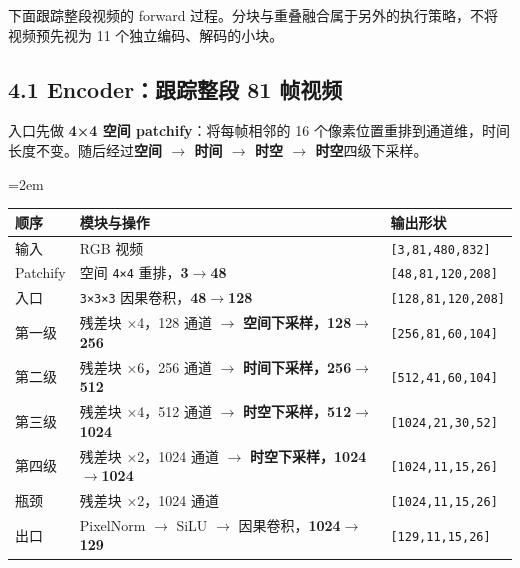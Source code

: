 \documentclass[
  11pt,
  a4paper,
  fontset=none]{ctexart}
\newcounter{none} %
\newcommand{\NotesTableStyle}{\linespread{1}\fontsize{9.5pt}{13pt}\selectfont\setlength{\tabcolsep}{4pt}\renewcommand{\arraystretch}{1.1}\setlength{\extrarowheight}{5pt}\setlength{\LTpre}{5pt}\setlength{\LTpost}{6pt}\setlength{\parskip}{0pt}\emergencystretch=2em}
\begin{document}
下面跟踪整段视频的 forward
过程。分块与重叠融合属于另外的执行策略，不将视频预先视为 11
个独立编码、解码的小块。


\subsection{4.1 Encoder：跟踪整段 81 帧视频}\label{ltx25-encoder}

入口先做 \textbf{4×4 空间 patchify}：将每帧相邻的 16
个像素位置重排到通道维，时间长度不变。随后经过\textbf{空间
\(\rightarrow\) 时间 \(\rightarrow\) 时空 \(\rightarrow\)
时空}四级下采样。

\begingroup\NotesTableStyle\fontsize{10.5pt}{14pt}\selectfont\renewcommand{\arraystretch}{1.08}\setlength{\extrarowheight}{3pt}

{\def\LTcaptype{none} %
\begin{longtable}[]{@{}
  >{\raggedright\arraybackslash}p{}
  >{\raggedright\arraybackslash}p{}
  >{\raggedright\arraybackslash}p{}@{}}
\toprule\noalign{}
\begin{minipage}[b]{\linewidth}\raggedright
顺序
\end{minipage} & \begin{minipage}[b]{\linewidth}\raggedright
模块与操作
\end{minipage} & \begin{minipage}[b]{\linewidth}\raggedright
输出形状
\end{minipage} \\
\midrule\noalign{}
\endhead
\bottomrule\noalign{}
\endlastfoot
输入 & RGB 视频 & \texttt{{[}3,81,480,832{]}} \\
Patchify & 空间 \texttt{4×4} 重排，\textbf{3\(\rightarrow\)48} &
\texttt{{[}48,81,120,208{]}} \\
入口 & \texttt{3×3×3} 因果卷积，\textbf{48\(\rightarrow\)128} &
\texttt{{[}128,81,120,208{]}} \\
第一级 & 残差块 ×4，128 通道 \(\rightarrow\)
\textbf{空间下采样，128\(\rightarrow\)256} &
\texttt{{[}256,81,60,104{]}} \\
第二级 & 残差块 ×6，256 通道 \(\rightarrow\)
\textbf{时间下采样，256\(\rightarrow\)512} &
\texttt{{[}512,41,60,104{]}} \\
第三级 & 残差块 ×4，512 通道 \(\rightarrow\)
\textbf{时空下采样，512\(\rightarrow\)1024} &
\texttt{{[}1024,21,30,52{]}} \\
第四级 & 残差块 ×2，1024 通道 \(\rightarrow\)
\textbf{时空下采样，1024\(\rightarrow\)1024} &
\texttt{{[}1024,11,15,26{]}} \\
瓶颈 & 残差块 ×2，1024 通道 & \texttt{{[}1024,11,15,26{]}} \\
出口 & PixelNorm \(\rightarrow\) SiLU \(\rightarrow\)
因果卷积，\textbf{1024\(\rightarrow\)129} &
\texttt{{[}129,11,15,26{]}} \\
\end{longtable}
}
\end{document}
